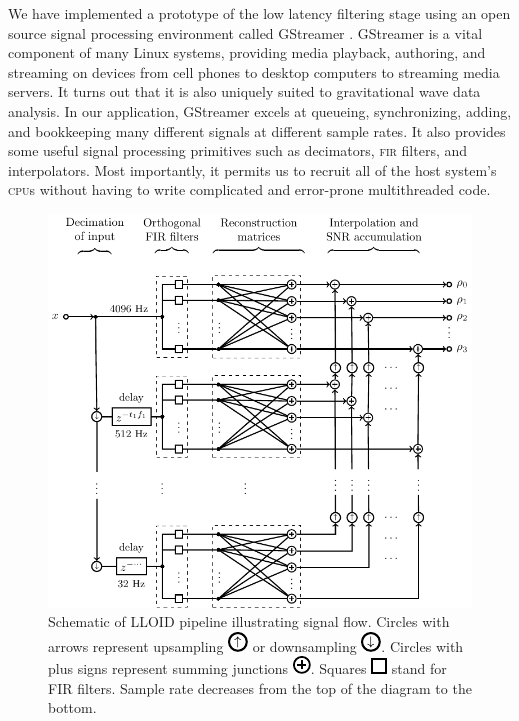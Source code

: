 We have implemented a prototype of the low latency filtering stage using an
open source signal processing environment called GStreamer \cite{gstreamer}.
GStreamer is a vital component of many Linux systems, providing media playback,
authoring, and streaming on devices from cell phones to desktop computers to
streaming media servers.  It turns out that it is also uniquely suited to
gravitational wave data analysis.  In our application, GStreamer excels at
queueing, synchronizing, adding, and bookkeeping many different signals at
different sample rates.  It also provides some useful signal processing
primitives such as decimators, \textsc{fir} filters, and interpolators.  Most
importantly, it permits us to recruit all of the host system's \textsc{cpu}s
without having to write complicated and error-prone multithreaded code.

\begin{figure}[htbp]
	\includegraphics{figures/lloid-diagram.pdf}
	\caption{Schematic of LLOID pipeline illustrating signal flow.  Circles with arrows represent upsampling \protect\includegraphics{figures/upsample-symbol.pdf} or downsampling \protect\includegraphics{figures/downsample-symbol.pdf}.  Circles with plus signs represent summing junctions \protect\includegraphics{figures/adder-symbol.pdf}.  Squares \protect\includegraphics{figures/fir-symbol.pdf} stand for FIR filters.  Sample rate decreases from the top of the diagram to the bottom.}
\end{figure}

